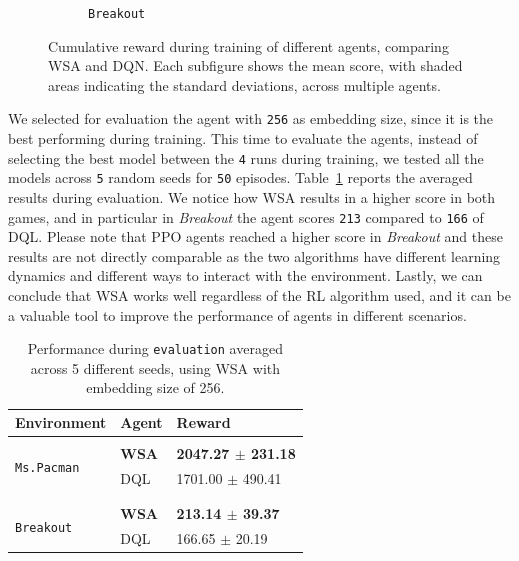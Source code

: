 \begin{figure}[htbp]
\begin{subfigure}[b]{0.45\textwidth}
        \caption{\texttt{Breakout}}
        \label{fig:breakout_dqn}
    \end{subfigure}
    \caption{Cumulative reward during training of different agents, comparing WSA and DQN. Each subfigure shows the mean score, with shaded areas indicating the standard deviations, across multiple agents.}
    \label{fig:dqn_experiments}
\end{figure}



We selected for evaluation the agent with \texttt{256} as embedding size, since it is the best performing during training.
This time to evaluate the agents, instead of selecting the best model between the \texttt{4} runs during training, we tested all the models across \texttt{5} random seeds for \texttt{50} episodes.
Table~\ref{tab:dqn_results} reports the averaged results during evaluation.
We notice how WSA results in a higher score in both games, and in particular in \textit{Breakout} the agent scores \texttt{213} compared to \texttt{166} of DQL\@.
Please note that PPO agents reached a higher score in \textit{Breakout} and these results are not directly comparable as the two algorithms have different learning dynamics and different ways to interact with the environment.
Lastly, we can conclude that WSA works well regardless of the RL algorithm used, and it can be a valuable tool to improve the performance of agents in different scenarios.



\begin{table}[ht]
    \begin{center}
        \begin{tabular}{lll}
            \multicolumn{1}{l}{Environment}  &\multicolumn{1}{l}{\textbf{Agent}} &\multicolumn{1}{l}{\textbf{Reward}}
            \\ \hline \\

            \multirow{2}{*}{\texttt{Ms.Pacman}}
                                  & \textbf{WSA} & \textbf{2047.27 $\pm$ 231.18} \\
                                  & DQL & 1701.00 $\pm$ 490.41 \\
                                  \\ \hline \\

            \multirow{2}{*}{\texttt{Breakout}}
                                  & \textbf{WSA} & \textbf{213.14 $\pm$ 39.37} \\
                                  & DQL & 166.65 $\pm$ 20.19 \\

        \end{tabular}
    \end{center}
    \caption{Performance during \texttt{evaluation} averaged across 5 different seeds, using WSA with embedding size of 256.}
    \label{tab:dqn_results}
\end{table}



